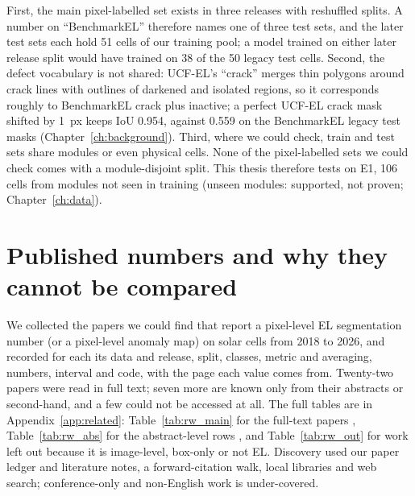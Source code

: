 First, the main pixel-labelled set exists in three releases with reshuffled splits. A number on ``BenchmarkEL'' therefore
names one of three test sets, and the later test sets each hold 51 cells of our training pool; a model trained on either later
release split would have trained on 38 of the 50 legacy test cells. Second, the defect vocabulary is not shared: UCF-EL's
``crack'' merges thin polygons around crack lines with outlines of darkened and isolated regions, so it corresponds roughly to
BenchmarkEL crack plus inactive; a perfect UCF-EL crack mask shifted by 1~px keeps IoU 0.954, against 0.559 on the
BenchmarkEL legacy test masks (Chapter~\ref{ch:background}). Third, where we could check, train and test sets share modules
or even physical cells. None of the pixel-labelled sets we could check comes with a module-disjoint split. This thesis therefore
tests on E1, 106 cells from modules not seen in training (unseen modules: supported, not proven; Chapter~\ref{ch:data}).

\section{Published numbers and why they cannot be compared}\label{sec:rw_numbers}

We collected the papers we could find that report a pixel-level EL segmentation number (or a pixel-level anomaly map) on
solar cells from 2018 to 2026, and recorded for each its data and release, split, classes, metric and averaging, numbers,
interval and code, with the page each value comes from. Twenty-two papers were read in full text; seven more are known only
from their abstracts or second-hand, and a few could not be accessed at all. The full tables are in Appendix~\ref{app:related}: Table~\ref{tab:rw_main} for the full-text papers
\citep{pratt2021unet,pratt2023benchmark,eesaar2023seipv,mazen2024segnet,torpey2024pretraining,jha2025pvs3,fioresi2022ucfel,%
hanifi2025multiclass,hanifi2025escdd,ramadan2026hybrid,lodhi2026efsegnet,chen2022pvsc,chen2023pvvision,sohail2023fault,%
elbahri2026autoencoder,sanghi2026multisolsegment,duan2025caak,gunasekara2026stcnet,saleh2026anomaly,lin2026eiae,su2021sigan,%
hijjawi2026instance}, Table~\ref{tab:rw_abs} for the abstract-level rows
\citep{mahboob2025segformer,nigin2025mcxnet,bramantyo2026fracture,liu2027pvread,zhou2024siif,wang2024rern,narayanan2024solar},
and Table~\ref{tab:rw_out} for work left out because it is image-level, box-only or not EL. Discovery used our paper ledger and
literature notes, a forward-citation walk, local libraries and web search; conference-only and non-English work is
under-covered.

